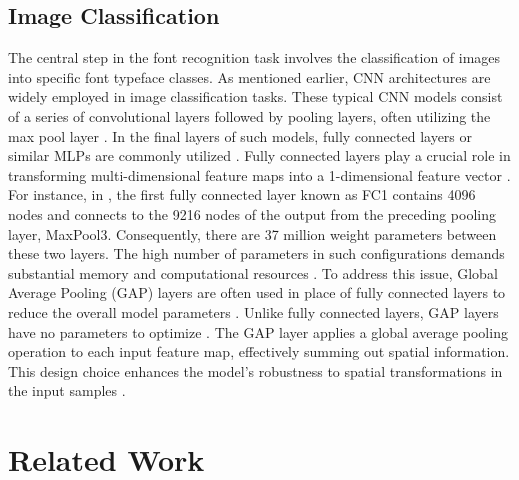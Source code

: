 \documentclass[conference]{IEEEtran}
\begin{document}
\subsection{Image Classification}
The central step in the font recognition task involves the classification of images into specific font typeface classes. As mentioned earlier, CNN architectures are widely employed in image classification tasks. These typical CNN models consist of a series of convolutional layers followed by pooling layers, often utilizing the max pool layer \cite{36}.
In the final layers of such models, fully connected layers or similar MLPs are commonly utilized \cite{36}. Fully connected layers play a crucial role in transforming multi-dimensional feature maps into a 1-dimensional feature vector \cite{43}.
For instance, in \cite{19}, the first fully connected layer known as FC1 contains 4096 nodes and connects to the 9216 nodes of the output from the preceding pooling layer, MaxPool3. Consequently, there are 37 million weight parameters between these two layers. The high number of parameters in such configurations demands substantial memory and computational resources \cite{43}.
To address this issue, Global Average Pooling (GAP) layers are often used in place of fully connected layers to reduce the overall model parameters \cite{43}. Unlike fully connected layers, GAP layers have no parameters to optimize \cite{43}.
The GAP layer applies a global average pooling operation to each input feature map, effectively summing out spatial information. This design choice enhances the model's robustness to spatial transformations in the input samples \cite{43}. \section{Related Work}
\end{document}
